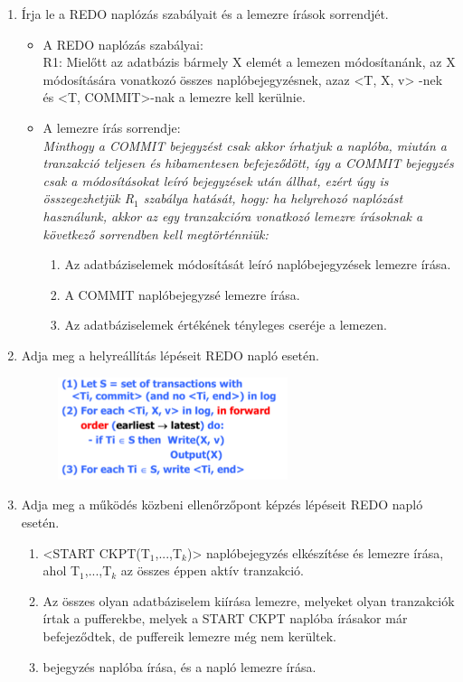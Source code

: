 \documentclass[a4paper,11.5pt, table]{article}
\begin{document}
\begin{enumerate}
\begin{itemize}
		\end{itemize}
	\item Írja le a REDO naplózás szabályait és a lemezre írások sorrendjét.
		\begin{itemize}
			\item A REDO naplózás szabályai:\\
			R1: Mielőtt az adatbázis bármely X elemét a lemezen módosítanánk, az X módosítására vonatkozó összes 
			naplóbejegyzésnek, azaz <T, X, v> -nek és <T, COMMIT>-nak a lemezre kell kerülnie.
			
			\item A lemezre írás sorrendje:\\
			\textit{Minthogy a COMMIT bejegyzést csak akkor írhatjuk a naplóba, miután a tranzakció teljesen és hibamentesen befejeződött, így a COMMIT bejegyzés csak a módosításokat leíró bejegyzések után állhat, ezért úgy is összegezhetjük R$_{1}$ szabálya hatását, hogy: ha helyrehozó naplózást használunk, akkor az egy tranzakcióra vonatkozó lemezre írásoknak a következő sorrendben kell megtörténniük:}
			\begin{enumerate}
				\item Az adatbáziselemek módosítását leíró naplóbejegyzések lemezre írása.
				\item A COMMIT naplóbejegyzsé lemezre írása.
				\item Az adatbáziselemek értékének tényleges cseréje a lemezen.
			\end{enumerate}
			
		\end{itemize}
	
	\item Adja meg a helyreállítás lépéseit REDO napló esetén.
		\begin{figure}[h]
			\centering
			\includegraphics[height = 3cm]{redo.png}
		\end{figure}

	\item Adja meg a működés közbeni ellenőrzőpont képzés lépéseit REDO napló esetén.
		\begin{enumerate}
			\item <START CKPT(T$_{1}$,...,T$_{k}$)> naplóbejegyzés elkészítése és lemezre írása, ahol T$_{1}$,...,T$_{k}$ az összes éppen aktív tranzakció.
			\item Az összes olyan adatbáziselem kiírása lemezre, melyeket olyan tranzakciók írtak a pufferekbe, melyek a START CKPT naplóba írásakor már befejeződtek, de puffereik lemezre még nem kerültek.
			\item <END CKPT> bejegyzés naplóba írása, és a napló lemezre írása.
		\end{enumerate}	
		

\end{enumerate}
\end{document}
